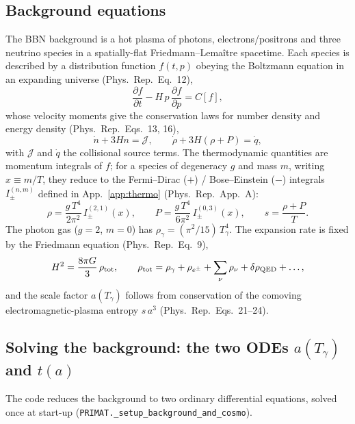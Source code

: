 \documentclass[11pt,a4paper]{article}
\newcommand{\Tg}{T_\gamma}
\newcommand{\code}[1]{\texttt{#1}}
\newcommand{\PR}{Phys.\ Rep.}
\begin{document}
\subsection{Background equations}
The BBN background is a hot plasma of photons, electrons/positrons and three
neutrino species in a spatially-flat Friedmann--Lema\^itre spacetime. Each
species is described by a distribution function $f(t,p)$ obeying the Boltzmann
equation in an expanding universe (\PR\ Eq.~12),
\begin{equation}
  \frac{\partial f}{\partial t} - H\,p\,\frac{\partial f}{\partial p}
  = C[f],
\end{equation}
whose velocity moments give the conservation laws for number density and energy
density (\PR\ Eqs.~13, 16),
\begin{equation}
  \dot n + 3 H n = \mathcal{J}, \qquad
  \dot\rho + 3H(\rho+P) = \dot q,
\label{eq:cons}
\end{equation}
with $\mathcal{J}$ and $\dot q$ the collisional source terms. The thermodynamic
quantities are momentum integrals of $f$; for a species of degeneracy $g$ and
mass $m$, writing $x\equiv m/T$, they reduce to the Fermi--Dirac ($+$) /
Bose--Einstein ($-$) integrals $I^{(n,m)}_\pm$ defined in
App.~\ref{app:thermo} (\PR\ App.~A):
\begin{equation}
  \rho = \frac{g\,T^4}{2\pi^2}\, I^{(2,1)}_\pm(x), \qquad
  P    = \frac{g\,T^4}{6\pi^2}\, I^{(0,3)}_\pm(x), \qquad
  s    = \frac{\rho+P}{T}.
\label{eq:thermo}
\end{equation}
The photon gas ($g=2$, $m=0$) has $\rho_\gamma = (\pi^2/15)\,\Tg^4$. The
expansion rate is fixed by the Friedmann equation (\PR\ Eq.~9),
\begin{equation}
  H^2 = \frac{8\pi G}{3}\,\rho_{\rm tot},
  \qquad
  \rho_{\rm tot} = \rho_\gamma + \rho_{e^\pm} + \sum_\nu \rho_\nu
                   + \delta\rho_{\rm QED} + \dots,
\label{eq:friedmann}
\end{equation}
and the scale factor $a(\Tg)$ follows from conservation of the comoving
electromagnetic-plasma entropy $s\,a^3$ (\PR\ Eqs.~21--24).

\subsection{Solving the background: the two ODEs $a(\Tg)$ and $t(a)$}
\label{sec:bckg-ode}
The code reduces the background to two ordinary differential equations, solved
once at start-up (\code{PRIMAT.\_setup\_background\_and\_cosmo}).
\end{document}
